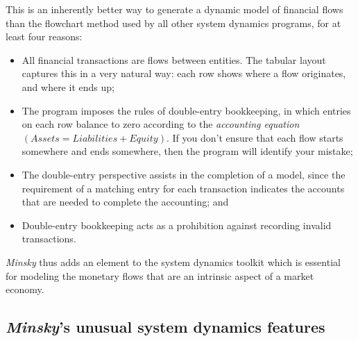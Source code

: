 This is an inherently better way to generate a dynamic model of financial
flows than the flowchart method used by all other system dynamics
programs, for at least four reasons: 
\begin{itemize}
\item All financial transactions are flows between entities. The tabular
layout captures this in a very natural way: each row shows where a
flow originates, and where it ends up;
\item The program imposes the rules of double-entry bookkeeping, in which
entries on each row balance to zero according to the {\em accounting
equation} $(Assets=Liabilities+Equity)$. If you don't ensure that
each flow starts somewhere and ends somewhere, then the program will
identify your mistake;
\item The double-entry perspective assists in the completion of a model,
since the requirement of a matching entry for each transaction indicates
the accounts that are needed to complete the accounting; and
\item Double-entry bookkeeping acts as a prohibition against recording invalid
transactions.
\end{itemize}
\emph{Minsky} thus adds an element to the system dynamics toolkit
which is essential for modeling the monetary flows that are an intrinsic
aspect of a market economy.

\subsection{\emph{Minsky}'s unusual system dynamics features}

